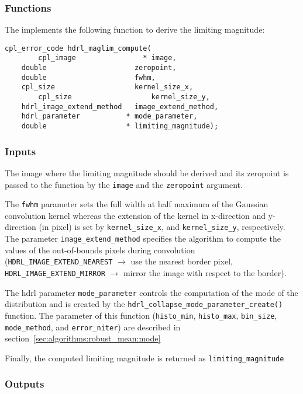 \subsubsection{\label{sec:algorithms:maglim:functions}Functions}

The \HDRL implements the following function to derive the limiting magnitude:

\begin{lstlisting}
cpl_error_code hdrl_maglim_compute(
        cpl_image                * image,
	double                     zeropoint,
	double                     fwhm,
	cpl_size                   kernel_size_x,
        cpl_size                   kernel_size_y,
	hdrl_image_extend_method   image_extend_method,
	hdrl_parameter           * mode_parameter,
	double                   * limiting_magnitude);
\end{lstlisting}


\subsubsection{\label{sec:algorithms:maglim:inputs}Inputs}

The image where the limiting magnitude should be derived and its
zeropoint is passed to the function by the \verb+image+ and the
\verb+zeropoint+ argument.

The \verb+fwhm+ parameter sets the full width at half maximum of the
Gaussian convolution kernel whereas the extension of the kernel in
x-direction and y-direction (in pixel) is set by \verb+kernel_size_x+,
and \verb+kernel_size_y+, respectively.  The parameter
\verb+image_extend_method+ specifies the algorithm to compute the
values of the out-of-bounds pixels during convolution
(\verb+HDRL_IMAGE_EXTEND_NEAREST+ $\rightarrow$ use the nearest border
pixel, \verb+HDRL_IMAGE_EXTEND_MIRROR+ $\rightarrow$ mirror the image
with respect to the border).

The hdrl parameter \verb+mode_parameter+ controls the computation of
the mode of the distribution and is created by the
\verb+hdrl_collapse_mode_parameter_create()+ function. The parameter
of this function (\verb+histo_min+, \verb+histo_max+, \verb+bin_size+,
\verb+mode_method+, and \verb+error_niter+) are described in
section~\ref{sec:algorithms:robust_mean:mode}

Finally, the computed limiting magnitude is returned as
\verb+limiting_magnitude+
  
\subsubsection{\label{sec:algorithms:maglim:outputs}Outputs}

